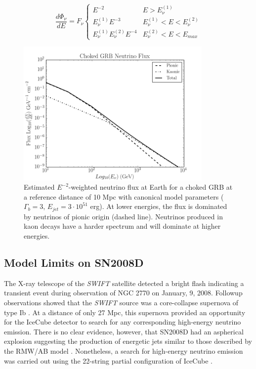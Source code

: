 \documentclass{gatech-thesis}
\begin{document}
\begin{equation}
\frac{d\Phi_\nu}{dE}=F_\nu\left\{\begin{array}{cc}
E^{-2} & E > E_{\nu}^{(1)} \\ 
E_{\nu}^{(1)}E^{-3} & E_{\nu}^{(1)}< E < E_{\nu}^{(2)} \\ 
E_{\nu}^{(1)}E_{\nu}^{(2)}E^{-4} & E_{\nu}^{(2)}< E < E_{max}
\end{array}\right.
\end{equation}



\begin{figure}[ht]
  \begin{center}
    \includegraphics[width=0.85\textwidth,keepaspectratio]{FluxPlot_Canonical_RespectiveFluenceNorm.png}
  \end{center}
  \caption{Estimated $E^{-2}$-weighted neutrino flux at Earth for a choked GRB at a reference distance of 10 Mpc with canonical model parameters ($\Gamma_{b}=3$, $E_{jet}=3\cdot 10^{51}$ erg). At lower energies, the flux is dominated by neutrinos of pionic origin (dashed line). Neutrinos produced in kaon decays have a harder spectrum and will dominate at higher energies.}
  \label{fig:ref_chkgrb_flux}
\end{figure}

\subsection{Model Limits on SN2008D}
The X-ray telescope of the \textit{SWIFT} satellite detected a bright flash indicating a transient event during observation of NGC 2770 on January, 9, 2008. Followup observations showed that the \textit{SWIFT} source was a core-collapse supernova of type Ib \cite{2008Natur.453..469S}. At a distance of only 27 Mpc, this supernova provided an opportunity for the IceCube detector to search for any corresponding high-energy neutrino emission. There is no clear evidence, however, that SN2008D had an aspherical explosion suggesting the production of energetic jets similar to those described by the RMW/AB model \cite{2008Natur.453..469S}. Nonetheless, a search for high-energy neutrino emission was carried out using the 22-string partial configuration of IceCube \cite{2011A&A...527A..28I}.
\end{document}
